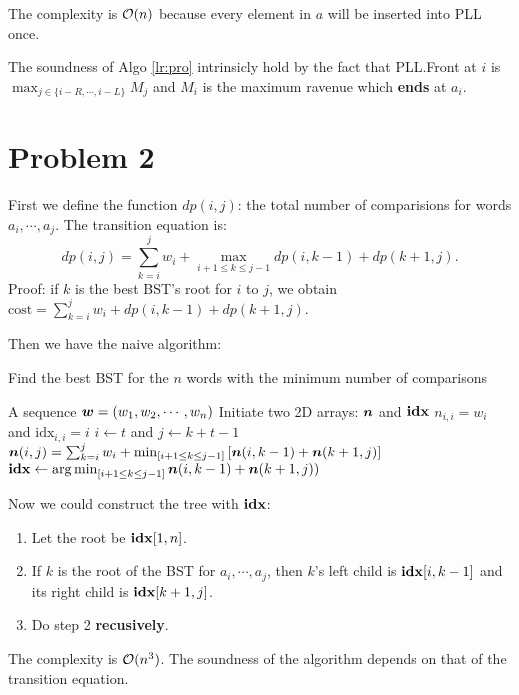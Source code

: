 \documentclass{article}
\begin{document}
The complexity is $\mathcal{O}(n)$ because every element in $a$ will be inserted into PLL once.

The soundness of Algo \ref{lr:pro} intrinsicly hold by the fact that PLL.Front at $i$ is  $\max_{j\in\{i-R,\cdots,i-L\}}M_j$ and $M_i$ is the maximum ravenue which \textbf{ends} at $a_i$.

\section*{Problem 2}

First we define the function $dp(i,j)$: the total number of comparisions for words  $a_i,\cdots,a_j$.
The transition equation is: 
\[
	dp(i,j) = \sum^{j}_{k=i}w_i + \max_{i+1\le k\le j-1} dp(i,k-1)+dp(k+1,j)
.\]
Proof: if $k$ is the best BST's root for $i$ to $j$, we obtain $\mathrm{cost}=\sum^{j}_{k=i}w_i + dp(i,k-1)+dp(k+1,j)$.

Then we have the naive algorithm:
\begin{algorithm}[H]
	\caption{Find the best BST for the $n$ words with the minimum number of comparisons}
	\label{bst}
	\begin{algorithmic}[1]
		\renewcommand{\algorithmicrequire}{\textbf{Input:}}
		\renewcommand{\algorithmicensure}{\textbf{Output:}}
		\renewcommand{\algorithmiccomment}[1]{\hfill\textit{\textcolor{blue}{\##1}}}
		\REQUIRE A sequence $\boldsymbol{w}=(w_1,w_2,\cdots,w_n)$
		\STATE Initiate two 2D arrays: $\boldsymbol{n}$ and $\boldsymbol{\mathrm{idx}}$
		\STATE $n_{i,i}=w_i$ and  $\mathrm{idx}_{i,i}=i$
		\STATE $i\gets t$ and $j\gets k+t-1$\\[3pt]
		\STATE $\boldsymbol{n}(i,j)=\sum^{j}_{k=i}w_i +
				\min_{[i+1\le k\le j-1]} \qty[\boldsymbol{n}(i,k-1)+\boldsymbol{n}(k+1,j)]$
				\\[3pt]
		\STATE $\boldsymbol{\mathrm{idx}}\gets\mathop{\arg\min}_{[i+1\le k\le j-1]}\boldsymbol{n}(i,k-1)+\boldsymbol{n}(k+1,j))$
		\ENDFOR
		\ENDFOR
	\end{algorithmic} 
\end{algorithm}
Now we could construct the tree with $\boldsymbol{\mathrm{idx}}$:
\begin{enumerate}
	\item 
		Let the root be $\boldsymbol{\mathrm{idx}}[1,n]$.
	\item
		If $k$ is the root of the BST for $a_i,\cdots,a_j$, then $k$'s left child is  $\boldsymbol{\mathrm{idx}}[i,k-1]$ and its right child is $\boldsymbol{\mathrm{idx}}[k+1,j]$.
	\item
		Do step 2 \textbf{recusively}.
\end{enumerate}
The complexity is $\mathcal{O}(n^3)$. The soundness of the algorithm depends on that of the transition equation.
\end{document}
